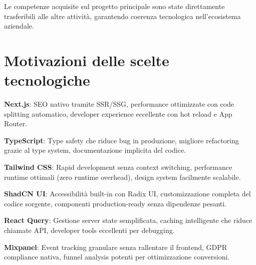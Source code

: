 Le competenze acquisite sul progetto principale sono state direttamente 
trasferibili alle altre attività, garantendo coerenza tecnologica 
nell'ecosistema aziendale.

\section{Motivazioni delle scelte tecnologiche}
\textbf{Next.js}: SEO nativo tramite SSR/SSG, performance ottimizzate 
con code splitting automatico, developer experience eccellente con 
hot reload e App Router.

\textbf{TypeScript}: Type safety che riduce bug in produzione, migliore 
refactoring grazie al type system, documentazione implicita del codice.

\textbf{Tailwind CSS}: Rapid development senza context switching, 
performance runtime ottimali (zero runtime overhead), design system 
facilmente scalabile.

\textbf{ShadCN UI}: Accessibilità built-in con Radix UI, customizzazione 
completa del codice sorgente, componenti production-ready senza 
dipendenze pesanti.

\textbf{React Query}: Gestione server state semplificata, caching 
intelligente che riduce chiamate API, developer tools eccellenti per 
debugging.

\textbf{Mixpanel}: Event tracking granulare senza rallentare il frontend, 
GDPR compliance nativa, funnel analysis potenti per ottimizzazione 
conversioni.